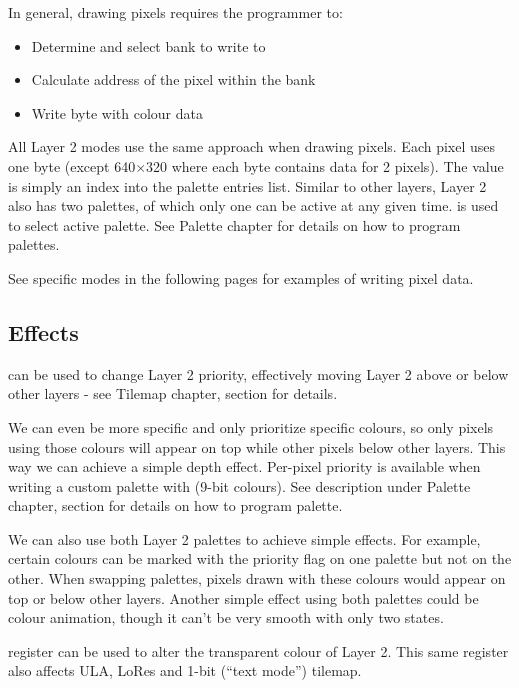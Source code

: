 In general, drawing pixels requires the programmer to:

\begin{itemize}[topsep=1pt,itemsep=1pt]
	\item Determine and select bank to write to
	\item Calculate address of the pixel within the bank
	\item Write byte with colour data
\end{itemize}

All Layer 2 modes use the same approach when drawing pixels. Each pixel uses one byte (except 640$\times$320 where each byte contains data for 2 pixels). The value is simply an index into the palette entries list. Similar to other layers, Layer 2 also has two palettes, of which only one can be active at any given time.  is used to select active palette. See Palette chapter  for details on how to program palettes.

See specific modes in the following pages for examples of writing pixel data.


\subsection{Effects}

 can be used to change Layer 2 priority, effectively moving Layer 2 above or below other layers - see Tilemap chapter, section  for details.

We can even be more specific and only prioritize specific colours, so only pixels using those colours will appear on top while other pixels below other layers. This way we can achieve a simple depth effect. Per-pixel priority is available when writing a custom palette with  (9-bit colours). See description under Palette chapter, section  for details on how to program palette.

We can also use both Layer 2 palettes to achieve simple effects. For example, certain colours can be marked with the priority flag on one palette but not on the other. When swapping palettes, pixels drawn with these colours would appear on top or below other layers. Another simple effect using both palettes could be colour animation, though it can't be very smooth with only two states.

 register can be used to alter the transparent colour of Layer 2. This same register also affects ULA, LoRes and 1-bit (``text mode'') tilemap. 

